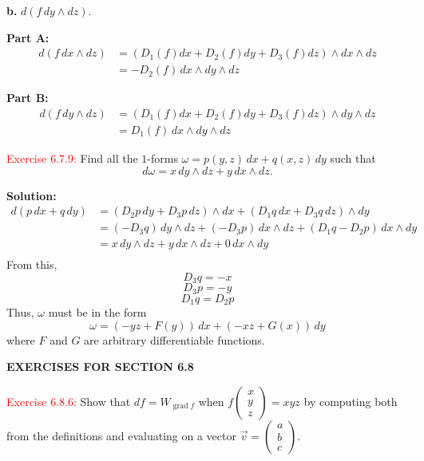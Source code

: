 \documentclass[12pt]{article}
\begin{document}
\textbf{b.} $d(f\, dy\wedge dz)$.
\smallskip

\textbf{Part A:}
\begin{align*}
    d(f\, dx\wedge dz)
    &= (D_1(f) dx + D_2(f) dy + D_3(f) dz) \wedge dx\wedge dz \\
    &= -D_2(f) \,dx \wedge dy\wedge dz
\end{align*}

\textbf{Part B:}
\begin{align*}
    d(f\, dy\wedge dz)
    &= (D_1(f) dx + D_2(f) dy + D_3(f) dz) \wedge dy\wedge dz \\
    &= D_1(f) \,dx \wedge dy\wedge dz
\end{align*}

\textcolor{red}{Exercise 6.7.9:}
Find all the $1$-forms $\omega = p(y,z) \, dx + q(x,z) \, dy$ such that
\begin{equation*}
    d\omega = x\, dy\wedge dz + y \, dx \wedge dz.
\end{equation*}
\smallskip

\textbf{Solution:}
\begin{align*}
    d(p\,dx + q \,dy)
    &= (D_2 p \,dy + D_3 p \,dz)\wedge dx + (D_1 q \,dx + D_3 q \,dz)\wedge dy \\
    &= (-D_3 q)\,dy\wedge dz + (-D_3 p)\,dx\wedge dz + (D_1 q - D_2 p)\,dx\wedge dy \\
    &= x \,dy\wedge dz + y \,dx\wedge dz + 0 \,dx\wedge dy \\
\end{align*}
From this,
\[
    D_3 q = -x
\]
\[
    D_3 p = -y
\]
\[
    D_1 q = D_2 p
\]
Thus, $\omega$ must be in the form 
\[
    \omega = (-yz + F(y))\, dx + (-xz + G(x)) \, dy
\]
where $F$ and $G$ are arbitrary differentiable functions.

\newpage
\begin{center}
   \textbf{EXERCISES FOR SECTION 6.8}
\end{center}

\textcolor{red}{Exercise 6.8.6:}
Show that $df = W_{ \operatorname{grad} f}$ when $f \begin{pmatrix}x\\y\\z\end{pmatrix}
=xyz$ by computing both from the definitions and evaluating on a vector $\vec v = \begin{pmatrix}a\\b\\c\end{pmatrix}$.
\smallskip
\end{document}
